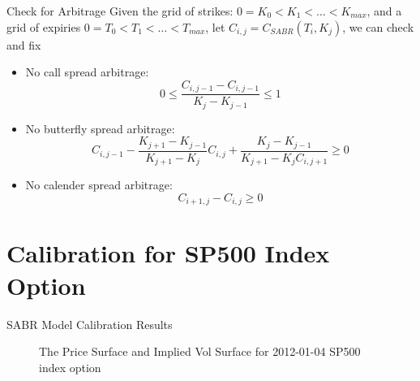\documentclass[10pt,table,mathserif]{beamer}
\begin{document}
\begin{frame}{Check for Arbitrage}
 Given the grid of strikes: $0=K_0<K_1<\dots<K_{max}$, and a grid of expiries $0=T_0 < T_1 < \dots< T_{max} $, let $C_{i,j}=C_{SABR}(T_i,K_{j})$, we can check and fix
\begin{itemize}
	\item No call spread arbitrage:
	\[
	0 \leq \frac{C_{i,j-1}-C_{i,j-1}}{K_j-K_{j-1}} \leq 1
    \]
    \item No butterfly spread arbitrage:
    \[C_{i,j-1}-
    \frac{K_{j+1}-K_{j-1}}{K_{j+1}-K_{j}}C_{i,j}+\frac{K_{j}-K_{j-1}}{K_{j+1}-K_{j}C_{i,j+1}} \geq 0
    \]
    \item No calender spread arbitrage:
    \[C_{i+1,j}-C_{i,j} \geq 0 \]
\end{itemize}
\end{frame}




\section{Calibration for SP500 Index Option}
\begin{frame}{SABR Model Calibration Results}
\begin{figure}
\caption{The Price Surface and Implied Vol Surface for 2012-01-04 SP500 index option}
\end{figure}
\end{frame}
\end{document}
